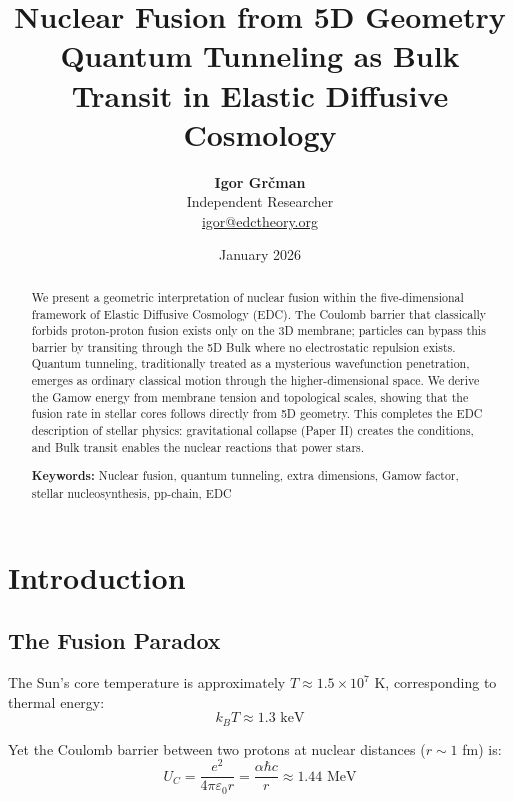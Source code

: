 \documentclass[12pt,a4paper]{article}
\title{
    \vspace{-1cm}
    {\LARGE\textbf{Nuclear Fusion from 5D Geometry}}\\[0.5cm]
    {\large Quantum Tunneling as Bulk Transit in Elastic Diffusive Cosmology}
}
\author{
    \textbf{Igor Grčman}\\[0.2cm]
    \small Independent Researcher\\
    \small \href{mailto:igor@edctheory.org}{igor@edctheory.org}
}
\date{January 2026}
\begin{document}
\maketitle

\begin{abstract}
We present a geometric interpretation of nuclear fusion within the five-dimensional framework of Elastic Diffusive Cosmology (EDC). The Coulomb barrier that classically forbids proton-proton fusion exists only on the 3D membrane; particles can bypass this barrier by transiting through the 5D Bulk where no electrostatic repulsion exists. Quantum tunneling, traditionally treated as a mysterious wavefunction penetration, emerges as ordinary classical motion through the higher-dimensional space. We derive the Gamow energy from membrane tension and topological scales, showing that the fusion rate in stellar cores follows directly from 5D geometry. This completes the EDC description of stellar physics: gravitational collapse (Paper II) creates the conditions, and Bulk transit enables the nuclear reactions that power stars.

\vspace{0.3cm}
\noindent\textbf{Keywords:} Nuclear fusion, quantum tunneling, extra dimensions, Gamow factor, stellar nucleosynthesis, pp-chain, EDC
\end{abstract}

\tableofcontents
\newpage

\section{Introduction}

\subsection{The Fusion Paradox}

The Sun's core temperature is approximately $T \approx 1.5 \times 10^7$ K, corresponding to thermal energy:
\begin{equation}
k_B T \approx 1.3 \text{ keV}
\end{equation}

Yet the Coulomb barrier between two protons at nuclear distances ($r \sim 1$ fm) is:
\begin{equation}
U_C = \frac{e^2}{4\pi\varepsilon_0 r} = \frac{\alpha \hbar c}{r} \approx 1.44 \text{ MeV}
\end{equation}
\end{document}
